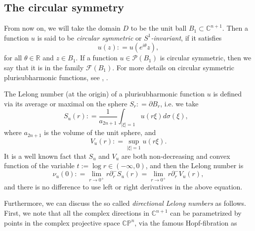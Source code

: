 \documentclass[a4paper,11pt]{amsart}
\numberwithin{equation}{section}
\def\d{\partial}
\def\cP{{\mathcal P}}
\def\cF{{\mathcal F}}
\def\cP{{\mathcal P}}
\def\bC{{\mathbb C}}
\def\bR{{\mathbb R}}
\def\bP{{\mathbb P}}
\def\cS{{\mathcal S}}
\begin{document}
\subsection{The circular symmetry}
From now on,
we will take the domain $D$ to be the unit ball $B_1\subset \bC^{n+1}$.
Then a function $u$ is said to be \emph{circular symmetric} or \emph{$S^1$-invariant}, 
if it satisfies
$$ u(z): = u(e^{i\theta}z), $$
for all $\theta\in \bR$ and $z\in B_1$.
If a function $u\in\cP(B_1)$ is circular symmetric, 
then we say that it is in the family $\cF(B_1)$. 
For more details on circular symmetric plurisubharmonic functions, see \cite{BB}, \cite{Li19}.




The Lelong number (at the origin) 
of a plurisubharmonic function $u$ 
is defined via its average or maximal on the sphere $S_r: = \d B_r$, 
i.e. we take   
$$ S_u(r): = \frac{1}{a_{2n+1}} \int_{|\xi|=1} u(r\xi) d\sigma(\xi), \ \ \ $$
where $a_{2n+1}$ is the volume of the unit sphere, and 
$$ V_u(r): = \sup_{|\xi|=1} u(r\xi).  $$
It is a well known fact \cite{GZ} that $S_u$ and $V_u$ are both non-decreasing and convex function of 
the variable $t:= \log r \in (-\infty, 0)$, 
and then the Lelong number is
\begin{equation}
\label{pre-0001}
\nu_u (0): = \lim_{r\rightarrow 0^+} r\d_r^- S_u (r) =  \lim_{r\rightarrow 0^+} r\d_r^- V_u (r),
\end{equation}
and there is no difference to use left or right derivatives in the above equation. 

Furthermore, 
we can discuss the so called \emph{directional Lelong numbers} as follows. 
First, we note that all the complex directions in $\bC^{n+1}$ can be parametrized by points 
in the complex projective space $\bC\bP^n$, via the famous Hopf-fibration as 
\\

\\
\end{document}
